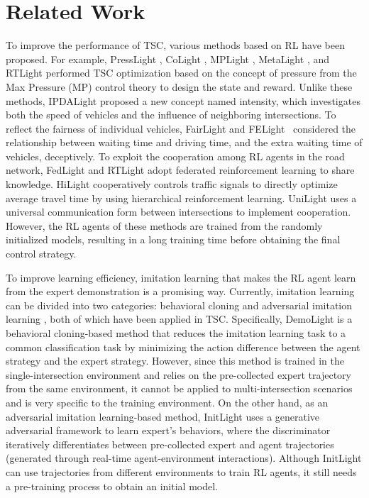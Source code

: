 \section{Related Work}
\vspace{-1ex}
To improve the performance of TSC, various methods based on RL have been proposed. For example, PressLight \cite{wei2019presslight}, CoLight \cite{wei2019colight}, MPLight \cite{chen2020toward}, MetaLight \cite{zang2020metalight}, and RTLight \cite{ye2023brief} performed TSC optimization based on the concept of pressure from the Max Pressure (MP) control theory \cite{varaiya2013max} to design the state and reward. Unlike these methods, IPDALight \cite{zhao2022ipdalight} proposed a new concept named intensity, which investigates both the speed of vehicles and the influence of neighboring intersections. To reflect the fairness of individual vehicles, FairLight \cite{ye2022fairlight} and FELight~\cite{du2024felight} considered the relationship between waiting time and driving time, and the extra waiting time of vehicles, deceptively. To exploit the cooperation among RL agents in the road network, FedLight \cite{ye2021fedlight} and RTLight \cite{ye2023brief} adopt federated reinforcement learning to share knowledge. HiLight \cite{xu2021hierarchically} cooperatively controls traffic signals to directly optimize average travel time by using hierarchical reinforcement learning. UniLight \cite{jiang2022multi} uses a universal communication form between intersections to implement cooperation. However, the RL agents of these methods are trained from the randomly initialized models, resulting in a long training time before obtaining the final control strategy.

To improve learning efficiency, imitation learning \cite{agarwal2019reinforcement,argall2009survey,hussein2017imitation,osa2018algorithmic} that makes the RL agent learn from the expert demonstration is a promising way. Currently, imitation learning can be divided into two categories: behavioral cloning \cite{bain1995framework,pomerleau1991efficient} and adversarial imitation learning \cite{abbeel2004apprenticeship,syed2007game,ziebart2008maximum}, both of which have been applied in TSC. Specifically, DemoLight \cite{xiong2019learning} is a behavioral cloning-based method that reduces the imitation learning task to a common classification task \cite{ross2010efficient,syed2010reduction} by minimizing the action difference between the agent strategy and the expert strategy. However, since this method is trained in the single-intersection environment and relies on the pre-collected expert trajectory from the same environment, it cannot be applied to multi-intersection scenarios and is very specific to the training environment. On the other hand, as an adversarial imitation learning-based method, InitLight \cite{ye2023initlight} uses a generative adversarial framework to learn expert's behaviors, where the discriminator iteratively differentiates between pre-collected expert and agent trajectories (generated through real-time agent-environment interactions). Although InitLight can use trajectories from different environments to train RL agents, it still needs a pre-training process to obtain an initial model.

